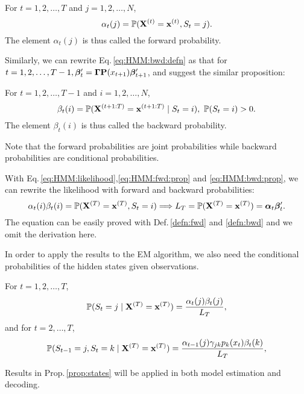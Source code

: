 		\begin{prop}
		\label{prop:fwd}
		For $t = 1,2,\dots,T$ and $j = 1,2,\dots,N$,
			\begin{equation}
			\label{eq:HMM:fwd:prop}
			\alpha_t(j) = \mathbb{P}({\mathbf X}^{(t)} = {\mathbf x}^{(t)}, S_t = j).
			\end{equation}
		The element $\alpha_t(j)$ is thus called the forward probability.
		\end{prop}

Similarly, we can rewrite Eq.\,\ref{eq:HMM:bwd:defn} as that 
for $t = 1,2,\dots,T-1, {\boldsymbol\beta}_{t}^{\prime} = {\boldsymbol\Gamma}{\mathbf P}(x_{t+1}){\boldsymbol\beta}_{t+1}^{\prime}$,
and suggest the similar proposition:
	
		\begin{prop}
		\label{prop:bwd}
		For $t = 1,2,\dots,T-1$ and $i = 1,2,\dots,N$,
			\begin{equation}
			\label{eq:HMM:bwd:prop}
			\beta_t(i) = \mathbb{P}({\mathbf X}^{(t+1:T)} = {\mathbf x}^{(t+1:T)} \mid S_t = i),\ \mathbb{P}(S_t = i)>0.
			\end{equation}
		The element $\beta_t(i)$ is thus called the backward probability.
		\end{prop}
Note that the forward probabilities are joint probabilities while
backward probabilities are conditional probabilities.

With Eq.\,\ref{eq:HMM:likelihood},\ref{eq:HMM:fwd:prop} and \ref{eq:HMM:bwd:prop},
we can rewrite the likelihood with forward and backward probabilities:
		\begin{equation}
		\label{eq:HMM:likelihood:fwdbwd}
		\alpha_t(i)\beta_t(i) = \mathbb{P}({\mathbf X}^{(T)} = {\mathbf x}^{(T)}, S_t = i) \Longrightarrow
		L_T = \mathbb{P}({\mathbf X}^{(T)} = {\mathbf x}^{(T)}) = {\boldsymbol\alpha}_t{\boldsymbol\beta}_t^{\prime}.
		\end{equation}
The equation can be easily proved with Def.\,\ref{defn:fwd} and \ref{defn:bwd} 
and we omit the derivation here.

In order to apply the results to the EM algorithm,
we also need the conditional probabilities of the hidden states given observations.
	
		\begin{prop}
		\label{prop:states}
		For $t = 1,2,\dots,T$,
			\begin{equation}
			\label{eq:HMM:states:cond}
			\mathbb{P}(S_t = j \mid {\mathbf X}^{(T)} = {\mathbf x}^{(T)}) = \frac{\alpha_t(j)\beta_t(j)}{L_T},
			\end{equation}
		and for $t = 2,\dots,T$,
			\begin{equation}
			\label{eq:HMM:states:trans}
			\mathbb{P}(S_{t-1} = j,S_t = k \mid {\mathbf X}^{(T)} = {\mathbf x}^{(T)}) = 
			\frac{\alpha_{t-1}(j)\gamma_{jk}p_k(x_t)\beta_t(k)}{L_T},
			\end{equation}
		\end{prop}
Results in Prop.\,\ref{prop:states} will be applied in both model estimation and decoding.


